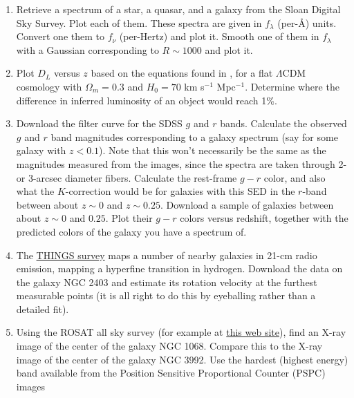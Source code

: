 \begin{enumerate}
\item Retrieve a spectrum of a star, a quasar, and a galaxy from the
  Sloan Digital Sky Survey. Plot each of them. These spectra are given
  in $f_\lambda$ (per-\AA) units. Convert one them to $f_\nu$
  (per-Hertz) and plot it. Smooth one of them in $f_\lambda$ with a
  Gaussian corresponding to $R\sim 1000$ and plot it.
\item Plot $D_L$ versus $z$ based on the equations found
  in \citet{hogg99cosm}, for a flat $\Lambda$CDM cosmology with
  $\Omega_m = 0.3$ and $H_0 = 70$ km s$^{-1}$ Mpc$^{-1}$. Determine
  where the difference in inferred luminosity of an object would reach
  1\%. 
\item Download the filter curve for the SDSS $g$ and $r$
  bands. Calculate the observed $g$ and $r$ band magnitudes
  corresponding to a galaxy spectrum (say for some galaxy with
  $z<0.1$). Note that this won't necessarily be the same as the
  magnitudes measured from the images, since the spectra are taken
  through 2- or 3-arcsec diameter fibers. Calculate the rest-frame
  $g-r$ color, and also what the $K$-correction would be for galaxies
  with this SED in the $r$-band between about $z\sim 0$ and $z\sim
  0.25$. Download a sample of galaxies between about $z\sim 0$ and
  $0.25$. Plot their $g-r$ colors versus redshift, together with the
  predicted colors of the galaxy you have a spectrum of.
\item The \href{http://www.mpia.de/THINGS}{THINGS survey} maps a
  number of nearby galaxies in 21-cm radio emission, mapping a
  hyperfine transition in hydrogen. Download the data on the galaxy
  NGC 2403 and estimate its rotation velocity at the furthest
  measurable points (it is all right to do this by eyeballing rather
  than a detailed fit).
\item Using the ROSAT all sky survey (for example
  at \href{http://www.xray.mpe.mpg.de/cgi-bin/rosat/rosat-survey}{this
  web site}), find an X-ray image of the center of the galaxy NGC
  1068. Compare this to the X-ray image of the center of the galaxy
  NGC 3992. Use the hardest (highest energy) band available from the
  Position Sensitive Proportional Counter (PSPC) images
\end{enumerate}


  
